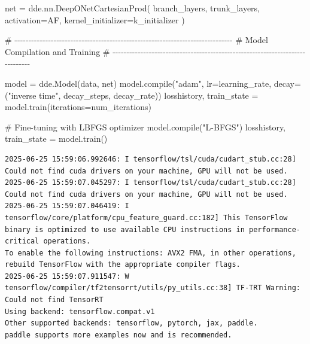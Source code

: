 \documentclass[
  spanish,
  us-letterpaper,
  DIV=11,
  numbers=noendperiod]{scrreprt}
\newenvironment{Shaded}{\begin{snugshade}}{\end{snugshade}}
\newcommand{\BuiltInTok}[1]{\textcolor[rgb]{0.00,0.23,0.31}{#1}}
\newcommand{\CommentTok}[1]{\textcolor[rgb]{0.37,0.37,0.37}{#1}}
\newcommand{\NormalTok}[1]{\textcolor[rgb]{0.00,0.23,0.31}{#1}}
\newcommand{\OperatorTok}[1]{\textcolor[rgb]{0.37,0.37,0.37}{#1}}
\newcommand{\StringTok}[1]{\textcolor[rgb]{0.13,0.47,0.30}{#1}}
\theoremstyle{plain}
\theoremstyle{definition}
\theoremstyle{remark}
\begin{document}
\begin{Shaded}
\begin{Highlighting}[]
\NormalTok{net }\OperatorTok{=}\NormalTok{ dde.nn.DeepONetCartesianProd(}
\NormalTok{    branch\_layers,}
\NormalTok{    trunk\_layers,}
\NormalTok{    activation}\OperatorTok{=}\NormalTok{AF,}
\NormalTok{    kernel\_initializer}\OperatorTok{=}\NormalTok{k\_initializer}
\NormalTok{)}

\CommentTok{\# {-}{-}{-}{-}{-}{-}{-}{-}{-}{-}{-}{-}{-}{-}{-}{-}{-}{-}{-}{-}{-}{-}{-}{-}{-}{-}{-}{-}{-}{-}{-}{-}{-}{-}{-}{-}{-}{-}{-}{-}{-}{-}{-}{-}{-}{-}{-}{-}{-}{-}{-}{-}{-}{-}{-}{-}{-}{-}{-}{-}{-}{-}{-}{-}{-}{-}{-}{-}{-}{-}{-}{-}{-}{-}{-}{-}{-}{-}}
\CommentTok{\# Model Compilation and Training}
\CommentTok{\# {-}{-}{-}{-}{-}{-}{-}{-}{-}{-}{-}{-}{-}{-}{-}{-}{-}{-}{-}{-}{-}{-}{-}{-}{-}{-}{-}{-}{-}{-}{-}{-}{-}{-}{-}{-}{-}{-}{-}{-}{-}{-}{-}{-}{-}{-}{-}{-}{-}{-}{-}{-}{-}{-}{-}{-}{-}{-}{-}{-}{-}{-}{-}{-}{-}{-}{-}{-}{-}{-}{-}{-}{-}{-}{-}{-}{-}{-}}

\NormalTok{model }\OperatorTok{=}\NormalTok{ dde.Model(data, net)}
\NormalTok{model.}\BuiltInTok{compile}\NormalTok{(}\StringTok{"adam"}\NormalTok{, lr}\OperatorTok{=}\NormalTok{learning\_rate, decay}\OperatorTok{=}\NormalTok{(}\StringTok{"inverse time"}\NormalTok{, decay\_steps, decay\_rate))}
\NormalTok{losshistory, train\_state }\OperatorTok{=}\NormalTok{ model.train(iterations}\OperatorTok{=}\NormalTok{num\_iterations)}

\CommentTok{\# Fine{-}tuning with LBFGS optimizer}
\NormalTok{model.}\BuiltInTok{compile}\NormalTok{(}\StringTok{"L{-}BFGS"}\NormalTok{)}
\NormalTok{losshistory, train\_state }\OperatorTok{=}\NormalTok{ model.train()}
\end{Highlighting}
\end{Shaded}

\begin{verbatim}
2025-06-25 15:59:06.992646: I tensorflow/tsl/cuda/cudart_stub.cc:28] Could not find cuda drivers on your machine, GPU will not be used.
2025-06-25 15:59:07.045297: I tensorflow/tsl/cuda/cudart_stub.cc:28] Could not find cuda drivers on your machine, GPU will not be used.
2025-06-25 15:59:07.046419: I tensorflow/core/platform/cpu_feature_guard.cc:182] This TensorFlow binary is optimized to use available CPU instructions in performance-critical operations.
To enable the following instructions: AVX2 FMA, in other operations, rebuild TensorFlow with the appropriate compiler flags.
2025-06-25 15:59:07.911547: W tensorflow/compiler/tf2tensorrt/utils/py_utils.cc:38] TF-TRT Warning: Could not find TensorRT
Using backend: tensorflow.compat.v1
Other supported backends: tensorflow, pytorch, jax, paddle.
paddle supports more examples now and is recommended.
\end{verbatim}
\end{document}
